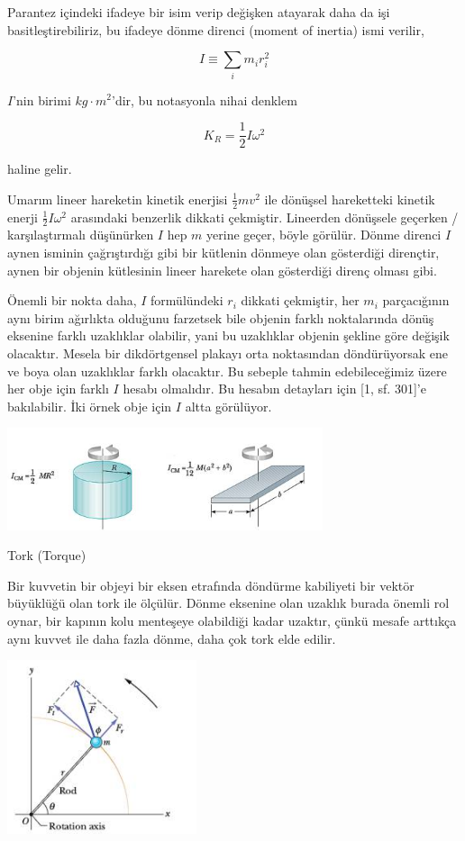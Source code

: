 \documentclass[12pt,fleqn]{article}\usepackage{../../common}
\begin{document}
Parantez içindeki ifadeye bir isim verip değişken atayarak daha da işi
basitleştirebiliriz, bu ifadeye dönme direnci (moment of inertia) ismi
verilir,

$$
I \equiv  \sum_i m_i r_i^2
$$

$I$'nin birimi $kg \cdot m^2$'dir, bu notasyonla nihai denklem

$$
K_R = \frac{1}{2} I \omega^2
$$

haline gelir. 

Umarım lineer hareketin kinetik enerjisi $\frac{1}{2} m v^2$ ile dönüşsel
hareketteki kinetik enerji $\frac{1}{2} I \omega^2$ arasındaki benzerlik
dikkati çekmiştir. Lineerden dönüşsele geçerken / karşılaştırmalı
düşünürken $I$ hep $m$ yerine geçer, böyle görülür. Dönme direnci $I$ aynen
isminin çağrıştırdığı gibi bir kütlenin dönmeye olan gösterdiği dirençtir,
aynen bir objenin kütlesinin lineer harekete olan gösterdiği direnç olması
gibi. 

Önemli bir nokta daha, $I$ formülündeki $r_i$ dikkati çekmiştir, her $m_i$
parçacığının aynı birim ağırlıkta olduğunu farzetsek bile objenin farklı
noktalarında dönüş eksenine farklı uzaklıklar olabilir, yani bu uzaklıklar
objenin şekline göre değişik olacaktır. Mesela bir dikdörtgensel plakayı
orta noktasından döndürüyorsak ene ve boya olan uzaklıklar farklı
olacaktır. Bu sebeple tahmin edebileceğimiz üzere her obje için farklı $I$
hesabı olmalıdır. Bu hesabın detayları için [1, sf. 301]'e bakılabilir. İki
örnek obje için $I$ altta görülüyor.

\includegraphics[width=25em]{phy_005_basics_02_11.jpg}

Tork (Torque)

Bir kuvvetin bir objeyi bir eksen etrafında döndürme kabiliyeti bir vektör
büyüklüğü olan tork ile ölçülür. Dönme eksenine olan uzaklık burada önemli
rol oynar, bir kapının kolu menteşeye olabildiği kadar uzaktır, çünkü
mesafe arttıkça aynı kuvvet ile daha fazla dönme, daha çok tork elde
edilir.

\includegraphics[width=15em]{phy_005_basics_02_12.jpg}
\end{document}
